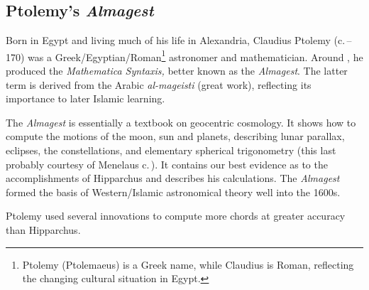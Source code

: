 \clearpage


\subsection{Ptolemy's \emph{Almagest}}

Born in Egypt and living much of his life in Alexandria, Claudius Ptolemy (c.\,--170) was a Greek/Egyptian/Roman\footnote{%
	Ptolemy (Ptolemaeus) is a Greek name, while Claudius is Roman, reflecting the changing cultural situation in Egypt.%
} astronomer and mathematician. Around , he produced the \emph{Mathematica Syntaxis,} better known as the \emph{Almagest}. The latter term is derived from the Arabic \emph{al-mageisti} (great work), reflecting its importance to later Islamic learning.\smallbreak
 
The \emph{Almagest} is essentially a textbook on geocentric cosmology. It shows how to compute the motions of the moon, sun and planets, describing lunar parallax, eclipses, the constellations, and elementary spherical trigonometry (this last probably courtesy of Menelaus c.\,). It contains our best evidence as to the accomplishments of Hipparchus and describes his calculations. The \emph{Almagest} formed the basis of Western/Islamic astronomical theory well into the 1600s.



Ptolemy used several innovations to compute more chords at greater accuracy than Hipparchus.

